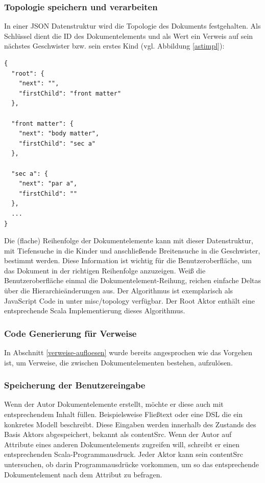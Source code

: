  
\subsubsection{Topologie speichern und verarbeiten}\label{}

 
In einer JSON Datenstruktur wird die Topologie des Dokuments festgehalten. Als Schlüssel dient die ID des Dokumentelements und als Wert ein Verweis auf sein nächstes Geschwister bzw. sein erstes Kind (vgl. Abbildung \ref{astimpl}):

 
\begin{verbatim}
{
  "root": {
    "next": "",
    "firstChild": "front matter"
  },

  "front matter": {
    "next": "body matter",
    "firstChild": "sec a"
  },

  "sec a": {
    "next": "par a",
    "firstChild": ""
  },
  ...
}
\end{verbatim}
 
Die (flache) Reihenfolge der Dokumentelemente kann mit dieser Datenstruktur, mit Tiefensuche in die Kinder und anschließende Breitensuche in die Geschwister, bestimmt werden. Diese Information ist wichtig für die Benutzeroberfläche, um das Dokument in der richtigen Reihenfolge anzuzeigen. Weiß die Benutzeroberfläche einmal die Dokumentelement-Reihung, reichen einfache Deltas über die Hierarchieänderungen aus. Der Algorithmus ist exemplarisch als JavaScript Code in \citep{HodappScaltex} unter misc/topology verfügbar. Der Root Aktor enthält eine entsprechende Scala Implementierung dieses Algorithmus.

 
\subsubsection{Code Generierung für Verweise}\label{}

 
In Abschnitt \ref{verweise-aufloesen} wurde bereits angesprochen wie das Vorgehen ist, um Verweise, die zwischen Dokumentelementen bestehen, aufzulösen.

 
\subsubsection{Speicherung der Benutzereingabe}\label{contentSrc}

 
Wenn der Autor Dokumentelemente erstellt, möchte er diese auch mit entsprechendem Inhalt füllen. Beispielsweise Fließtext oder eine DSL die ein konkretes Modell beschreibt. Diese Eingaben werden innerhalb des Zustands des Basis Aktors abgespeichert, bekannt als contentSrc. Wenn der Autor auf Attribute eines anderen Dokumentelements zugreifen will, schreibt er einen entsprechenden Scala-Programmausdruck. Jeder Aktor kann sein contentSrc untersuchen, ob darin Programmausdrücke vorkommen, um so das entsprechende Dokumentelement nach dem Attribut zu befragen.

